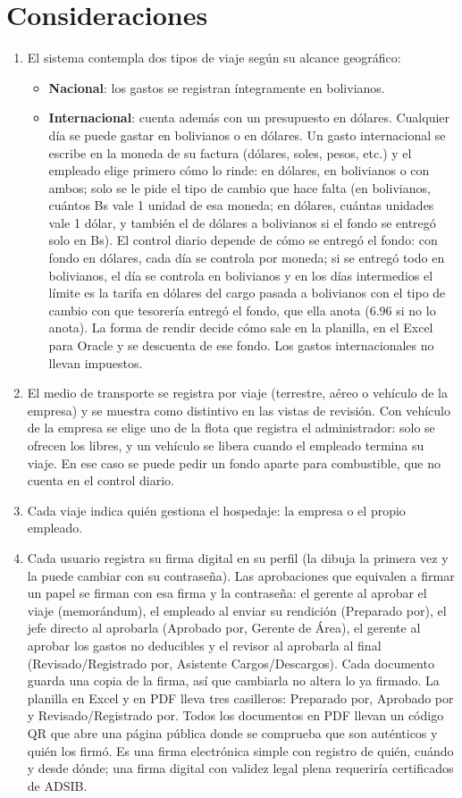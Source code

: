 \documentclass[11pt,letterpaper]{article}
\begin{document}
\section{Consideraciones}
\begin{enumerate}
  \item El sistema contempla dos tipos de viaje según su alcance geográfico:
  \begin{itemize}
    \item \textbf{Nacional}: los gastos se registran íntegramente en bolivianos.
    \item \textbf{Internacional}: cuenta además con un presupuesto en dólares. Cualquier día se puede gastar en bolivianos o en dólares. Un gasto internacional se escribe en la moneda de su factura (dólares, soles, pesos, etc.) y el empleado elige primero cómo lo rinde: en dólares, en bolivianos o con ambos; solo se le pide el tipo de cambio que hace falta (en bolivianos, cuántos Bs vale 1 unidad de esa moneda; en dólares, cuántas unidades vale 1 dólar, y también el de dólares a bolivianos si el fondo se entregó solo en Bs). El control diario depende de cómo se entregó el fondo: con fondo en dólares, cada día se controla por moneda; si se entregó todo en bolivianos, el día se controla en bolivianos y en los días intermedios el límite es la tarifa en dólares del cargo pasada a bolivianos con el tipo de cambio con que tesorería entregó el fondo, que ella anota (6.96 si no lo anota). La forma de rendir decide cómo sale en la planilla, en el Excel para Oracle y se descuenta de ese fondo. Los gastos internacionales no llevan impuestos.
  \end{itemize}
  \item El medio de transporte se registra por viaje (terrestre, aéreo o vehículo de la empresa) y se muestra como distintivo en las vistas de revisión. Con vehículo de la empresa se elige uno de la flota que registra el administrador: solo se ofrecen los libres, y un vehículo se libera cuando el empleado termina su viaje. En ese caso se puede pedir un fondo aparte para combustible, que no cuenta en el control diario.
  \item Cada viaje indica quién gestiona el hospedaje: la empresa o el propio empleado.
  \item Cada usuario registra su firma digital en su perfil (la dibuja la primera vez y la puede cambiar con su contraseña). Las aprobaciones que equivalen a firmar un papel se firman con esa firma y la contraseña: el gerente al aprobar el viaje (memorándum), el empleado al enviar su rendición (Preparado por), el jefe directo al aprobarla (Aprobado por, Gerente de Área), el gerente al aprobar los gastos no deducibles y el revisor al aprobarla al final (Revisado/Registrado por, Asistente Cargos/Descargos). Cada documento guarda una copia de la firma, así que cambiarla no altera lo ya firmado. La planilla en Excel y en PDF lleva tres casilleros: Preparado por, Aprobado por y Revisado/Registrado por. Todos los documentos en PDF llevan un código QR que abre una página pública donde se comprueba que son auténticos y quién los firmó. Es una firma electrónica simple con registro de quién, cuándo y desde dónde; una firma digital con validez legal plena requeriría certificados de ADSIB.

\end{enumerate}
\end{document}
